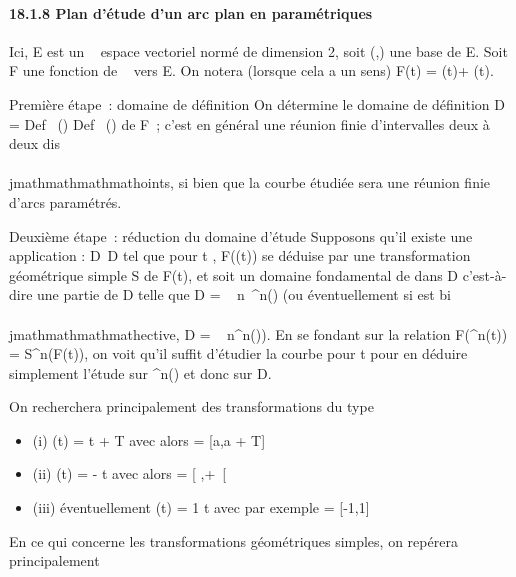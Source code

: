 \paragraph{18.1.8 Plan d'étude d'un arc plan en paramétriques}

Ici, E est un ~ espace vectoriel normé de dimension 2, soit
(\vec\imath,) une base de E. Soit
F une fonction de ~ vers E. On notera (lorsque cela a un sens) F(t) =
\phi(t)\vec\imath + \psi(t).

Première étape~: domaine de définition On détermine le domaine de
définition D = Def~ (\phi)
\bigcap Def~ (\psi) de F~; c'est en général une réunion
finie d'intervalles deux à deux dis\\\\jmathmathmathmathoints, si bien que la courbe étudiée
sera une réunion finie d'arcs paramétrés.

Deuxième étape~: réduction du domaine d'étude Supposons qu'il existe une
application \theta : D\rightarrow~D tel que pour t \inD, F(\theta(t)) se déduise par une
transformation géométrique simple S de F(t), et soit \Delta un domaine
fondamental de \theta dans D c'est-à-dire une partie de D telle que D
= \⋃ ~
n\in{}~\theta^n(\Delta) (ou éventuellement si \theta est bi\\\\jmathmathmathmathective, D
= \⋃ ~
n\theta^n(\Delta)). En se fondant sur la relation
F(\theta^n(t)) = S^n(F(t)), on voit qu'il suffit
d'étudier la courbe pour t \in \Delta pour en déduire simplement l'étude sur
\theta^n(\Delta) et donc sur D.

On recherchera principalement des transformations \theta du type

\begin{itemize}
\itemsep1pt\parskip0pt
\item
  (i) \theta(t) = t + T avec alors \Delta = {[}a,a + T{]} \bigcapD
\item
  (ii) \theta(t) = \omega - t avec alors \Delta = {[} \omega {}
  ,+\infty~{[}\bigcapD
\item
  (iii) éventuellement \theta(t) = 1 \over t avec par
  exemple \Delta = {[}-1,1{]} \bigcapD
\end{itemize}

En ce qui concerne les transformations géométriques simples, on repérera
principalement

